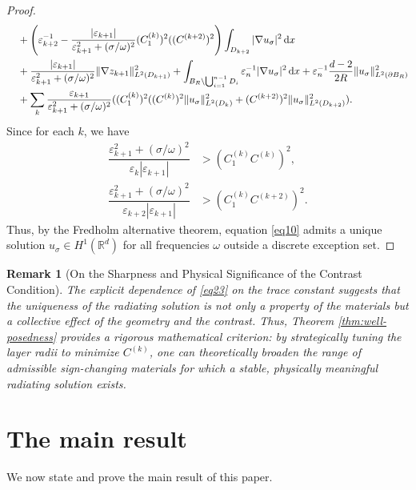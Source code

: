 \documentclass[12pt,reqno]{amsart}
\newtheorem{remark}[theorem]{Remark}
\numberwithin{equation}{section}
\begin{document}
\begin{proof}
\begin{align*}
&\quad+\Bigg(\varepsilon_{k+2}^{-1}-\dfrac{|\varepsilon_{k+1}|}{\varepsilon_{k+1}^2+(\sigma/\omega)^2}(C_1^{(k)})^2((C^{(k+2)})^2\Bigg)\int_{D_{k+2}}|\nabla u_\sigma|^2\,{\rm d}x\\
&\quad+ \dfrac{|\varepsilon_{k+1}|}{\varepsilon_{k+1}^2+(\sigma/\omega)^2}\|\nabla z_{k+1}\|_{L^2(D_{k+1})}^2+\int_{B_{R}\setminus\bigcup_{i=1}^{n-1}D_i}\varepsilon_n^{-1}|\nabla u_\sigma|^2\,{\rm d}x
+\varepsilon_n^{-1}\frac{d-2}{2R}\|u_\sigma\|_{L^2(\partial B_R)}^2\\
&\quad+\sum_k\dfrac{\varepsilon_{k+1}}{\varepsilon_{k+1}^2+(\sigma/\omega)^2}((C_1^{(k)})^2((C^{(k)})^2\|u_\sigma\|^2_{L^2(D_{k})}+(C^{(k+2)})^2\| u_\sigma\|^2_{L^2(D_{k+2})})
.
\end{align*}
Since for each $k$, we have
\begin{equation}\label{eq14}
\begin{aligned}
\dfrac{\varepsilon_{k+1}^2+(\sigma/\omega)^2}{\varepsilon_k|\varepsilon_{k+1}|} &> (C_1^{(k)}C^{(k)})^2, \\
\dfrac{\varepsilon_{k+1}^2+(\sigma/\omega)^2}{\varepsilon_{k+2}|\varepsilon_{k+1}|} &> (C_1^{(k)}C^{(k+2)})^2.
\end{aligned}
\end{equation}
Thus, by the Fredholm alternative theorem, equation \eqref{eq10} admits a unique solution $u_\sigma \in H^1(\mathbb{R}^d)$ for all frequencies $\omega$ outside a discrete exception set.










\end{proof}

\begin{remark}[On the Sharpness and Physical Significance of the Contrast Condition]
The explicit dependence of \eqref{eq23} on the trace constant suggests that the uniqueness of the radiating solution is not only a property of the materials but a collective effect of the geometry and the contrast. Thus, Theorem \ref{thm:well-posedness} provides a rigorous mathematical criterion: by strategically tuning the layer radii to minimize $C^{(k)}$, one can theoretically broaden the range of admissible sign-changing materials for which a stable, physically meaningful radiating solution exists.
\end{remark}





\section{The main result}\label{sec4}
We now state and prove the main result of this paper.
\end{document}
